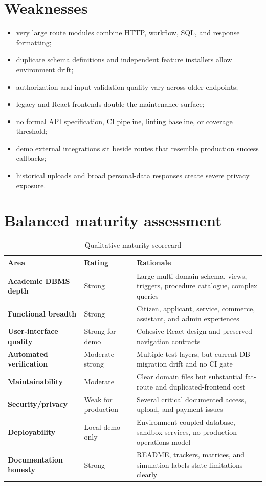 \documentclass[12pt,a4paper,oneside]{report}
\begin{document}
\section{Weaknesses}

\begin{itemize}
  \item very large route modules combine HTTP, workflow, SQL, and response formatting;
  \item duplicate schema definitions and independent feature installers allow environment drift;
  \item authorization and input validation quality vary across older endpoints;
  \item legacy and React frontends double the maintenance surface;
  \item no formal API specification, CI pipeline, linting baseline, or coverage threshold;
  \item demo external integrations sit beside routes that resemble production success callbacks;
  \item historical uploads and broad personal-data responses create severe privacy exposure.
\end{itemize}

\section{Balanced maturity assessment}

\begin{table}[htbp]
\centering
\caption{Qualitative maturity scorecard}
\begin{tabularx}{\textwidth}{>{\bfseries}p{} p{} X}
\toprule
Area & Rating & Rationale\\
\midrule
Academic DBMS depth & Strong & Large multi-domain schema, views, triggers, procedure catalogue, complex queries\\
Functional breadth & Strong & Citizen, applicant, service, commerce, assistant, and admin experiences\\
User-interface quality & Strong for demo & Cohesive React design and preserved navigation contracts\\
Automated verification & Moderate--strong & Multiple test layers, but current DB migration drift and no CI gate\\
Maintainability & Moderate & Clear domain files but substantial fat-route and duplicated-frontend cost\\
Security/privacy & Weak for production & Several critical documented access, upload, and payment issues\\
Deployability & Local demo only & Environment-coupled database, sandbox services, no production operations model\\
Documentation honesty & Strong & README, trackers, matrices, and simulation labels state limitations clearly\\
\bottomrule
\end{tabularx}
\end{table}
\end{document}
